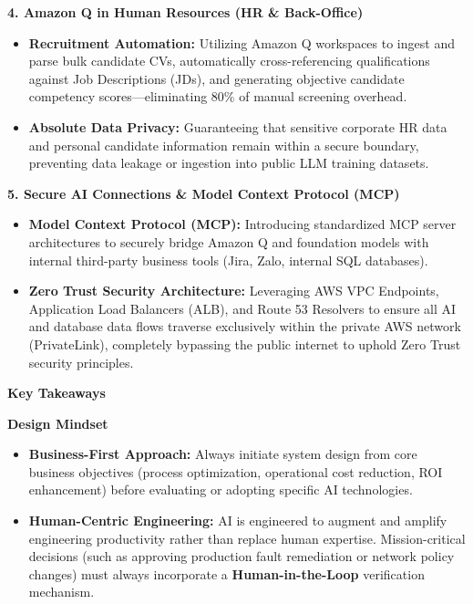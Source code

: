 \vspace{0.5em}\noindent\textbf{4. Amazon Q in Human Resources (HR \& Back-Office)}

\begin{itemize}
\tightlist
\item
  \textbf{Recruitment Automation:} Utilizing Amazon Q workspaces to
  ingest and parse bulk candidate CVs, automatically cross-referencing
  qualifications against Job Descriptions (JDs), and generating
  objective candidate competency scores---eliminating 80\% of manual
  screening overhead.
\item
  \textbf{Absolute Data Privacy:} Guaranteeing that sensitive corporate
  HR data and personal candidate information remain within a secure
  boundary, preventing data leakage or ingestion into public LLM
  training datasets.
\end{itemize}

\vspace{0.5em}\noindent\textbf{5. Secure AI Connections \& Model Context Protocol (MCP)}

\begin{itemize}
\tightlist
\item
  \textbf{Model Context Protocol (MCP):} Introducing standardized MCP
  server architectures to securely bridge Amazon Q and foundation models
  with internal third-party business tools (Jira, Zalo, internal SQL
  databases).
\item
  \textbf{Zero Trust Security Architecture:} Leveraging AWS VPC
  Endpoints, Application Load Balancers (ALB), and Route 53 Resolvers to
  ensure all AI and database data flows traverse exclusively within the
  private AWS network (PrivateLink), completely bypassing the public
  internet to uphold Zero Trust security principles.
\end{itemize}

\vspace{0.5em}\noindent\textbf{Key Takeaways}

\vspace{0.5em}\noindent\textbf{Design Mindset}

\begin{itemize}
\tightlist
\item
  \textbf{Business-First Approach:} Always initiate system design from
  core business objectives (process optimization, operational cost
  reduction, ROI enhancement) before evaluating or adopting specific AI
  technologies.
\item
  \textbf{Human-Centric Engineering:} AI is engineered to augment and
  amplify engineering productivity rather than replace human expertise.
  Mission-critical decisions (such as approving production fault
  remediation or network policy changes) must always incorporate a
  \textbf{Human-in-the-Loop} verification mechanism.
\end{itemize}

